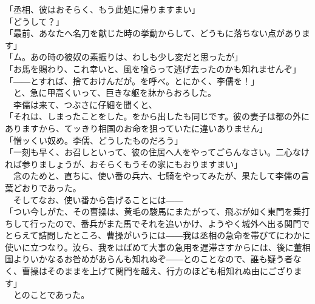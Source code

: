 \documentclass[
  paper=a5,
  fontsize=10pt,
  jafontsize=9.5pt,
  tate,                  %
  open_bracket_pos=nibu, %
]{jlreq}
\begin{document}
「丞相、彼はおそらく、もう此処に帰りますまい」\\


「どうして？」\\


「最前、あなたへ名刀を献じた時の挙動からして、どうもに落ちない点があります」\\


「ム。あの時の彼奴の素振りは、わしも少し変だと思ったが」\\


「お馬を賜わり、これ幸いと、風を喰らって逃げ去ったのかも知れませんぞ」\\


「――とすれば、捨ておけんだが。を呼べ。とにかく、李儒を！」\\


　と、急に甲高くいって、巨きな躯を牀からおろした。\\


　李儒は来て、つぶさに仔細を聞くと、\\


「それは、しまったことをした。をから出したも同じです。彼の妻子は都の外にありますから、てッきり相国のお命を狙っていたに違いありません」\\


「憎ッくい奴め。李儒、どうしたものだろう」\\


「一刻も早く、お召しといって、彼の住居へ人をやってごらんなさい。二心なければ参りましょうが、おそらくもうその家にもおりますまい」\\


　念のためと、直ちに、使い番の兵六、七騎をやってみたが、果たして李儒の言葉どおりであった。\\


　そしてなお、使い番から告げることには――\\


「つい今しがた、その曹操は、黄毛の駿馬にまたがって、飛ぶが如く東門を乗打ちして行ったので、番兵がまた馬でそれを追いかけ、ようやく城外へ出る関門でとらえて詰問したところ、曹操がいうには――我は丞相の急命を帯びてにわかに使いに立つなり。汝ら、我をはばめて大事の急用を遅滞さすからには、後に董相国よりいかなるお咎めがあらんも知れぬぞ――とのことなので、誰も疑う者なく、曹操はそのままを上げて関門を越え、行方のほども相知れぬ由にござります」\\


　とのことであった。\\
\end{document}
